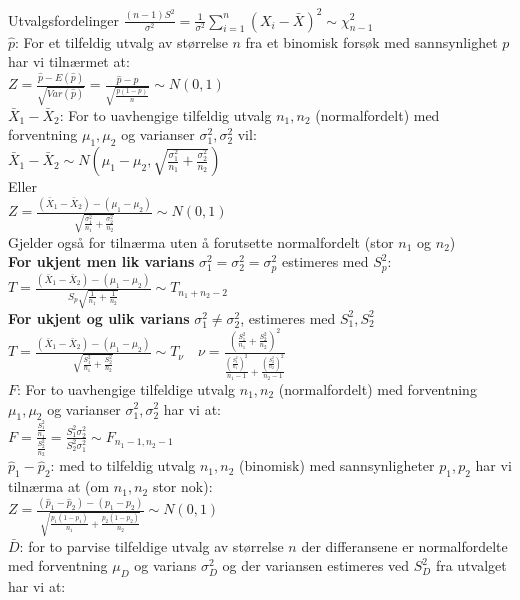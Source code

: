 \documentclass[final,hyperref={pdfpagelabels=false}]{beamer}
\begin{document}
\begin{frame}{}
\begin{columns}[t]
\begin{column}{.25\linewidth}
\begin{block}{\center\normalsize Utvalgsfordelinger}
{					$\frac{(n-1)S^2}{\sigma^2}=\frac{1}{\sigma^2}\sum_{i=1}^n(X_i-\bar X)^2\sim \chi^2_{n-1}$\\
					$\hat p$: For et tilfeldig utvalg av størrelse $n$ fra et binomisk forsøk med sannsynlighet $p$ har vi tilnærmet at:\\
					$Z=\frac{\hat p - E(\hat p)}{\sqrt{Var(\hat p)}}=\frac{\hat p - p}{\sqrt{\frac{p(1-p)}{n}}}\sim N(0,1)$ \\
					$\bar X_1 - \bar X_2$: For to uavhengige tilfeldig utvalg $n_1,n_2$ (normalfordelt) med forventning $\mu_1,\mu_2$ og varianser $\sigma_1^2,\sigma_2^2$ vil: \\
					$\bar X_1 - \bar X_2 \sim N\left( \mu_1-\mu_2,\sqrt{\frac{\sigma_1^2}{n_1}+\frac{\sigma_2^2}{n_2}} \right)$\\
					Eller\\
					$Z=\frac{(\bar X_1 - \bar X_2)-(\mu_1-\mu_2)}{\sqrt{\frac{\sigma_1^2}{n_1}+\frac{\sigma_2^2}{n_2}}}\sim N(0,1)$\\
					Gjelder også for tilnærma uten å forutsette normalfordelt (stor $n_1$ og $n_2$)\\
					\textbf{For ukjent men lik varians} $\sigma_1^2=\sigma_2^2=\sigma_p^2$ estimeres med $S^2_p$:\\
					$T=\frac{(\bar X_1 - \bar X_2)-(\mu_1-\mu_2)}{S_p\sqrt{\frac{1}{n_1}+\frac{1}{n_2}}}\sim T_{n_1+n_2-2}$\\
					\textbf{For ukjent og ulik varians} $\sigma_1^2\neq\sigma_2^2$, estimeres med $S_1^2,S_2^2$\\
					$T=\frac{(\bar X_1 - \bar X_2)-(\mu_1-\mu_2)}{\sqrt{\frac{S_1^2}{n_1}+\frac{S_2^2}{n_2}}}\sim T_{\nu}\quad \nu=\frac{\left(\frac{S_1^2}{n_1} + \frac{S_2^2}{n_2} \right)^2}{\frac{\left(\frac{S_1^2}{n_1}\right)^2}{n_1-1} + \frac{\left( \frac{S_2^2}{n_2} \right)^2}{n_2-1}}$\\
					$F$: For to uavhengige tilfeldige utvalg $n_1,n_2$ (normalfordelt) med forventning $\mu_1,\mu_2$ og varianser $\sigma_1^2,\sigma_2^2$ har vi at: \\
					$F=\frac{\frac{S_1^2}{n_1}}{\frac{S_2^2}{n_2}}=\frac{S_1^2\sigma_2^2}{S_2^2\sigma_1^2}\sim F_{n_1-1,n_2-1}$\\
					$\hat p_1 - \hat p_2$: med to tilfeldig utvalg $n_1,n_2$ (binomisk) med sannsynligheter $p_1,p_2$ har vi tilnærma at (om $n_1,n_2$ stor nok):\\
					$Z=\frac{(\hat p_1 -\hat p_2)-(p_1-p_2)}{\sqrt{\frac{p_1(1-p_1)}{n_1}+\frac{p_2(1-p_2)}{n_2}}}\sim N(0,1)$\\
					$\bar D$: for to parvise tilfeldige utvalg av størrelse $n$ der differansene er normalfordelte med forventning $\mu_D$ og varians $\sigma_D^2$ og der variansen estimeres ved $S_D^2$ fra utvalget har vi at:\\
}
\end{block}
\end{column}
\end{columns}
\end{frame}
\end{document}
